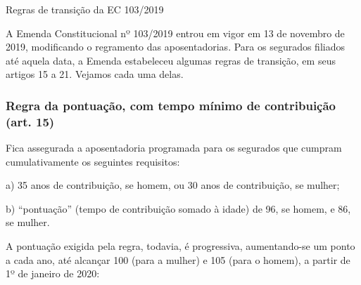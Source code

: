 \documentclass[
  letterpaper,
  DIV=11,
  numbers=noendperiod]{scrartcl}
\begin{document}
Regras de transição da EC 103/2019

A Emenda Constitucional nº 103/2019 entrou em vigor em 13 de novembro de
2019, modificando o regramento das aposentadorias. Para os segurados
filiados até aquela data, a Emenda estabeleceu algumas regras de
transição, em seus artigos 15 a 21. Vejamos cada uma delas.

\hypertarget{regra-da-pontuauxe7uxe3o-com-tempo-muxednimo-de-contribuiuxe7uxe3o-art.-15}{%
\subsubsection{Regra da pontuação, com tempo mínimo de contribuição
(art.
15)}\label{regra-da-pontuauxe7uxe3o-com-tempo-muxednimo-de-contribuiuxe7uxe3o-art.-15}}

Fica assegurada a aposentadoria programada para os segurados que cumpram
cumulativamente os seguintes requisitos:

a) 35 anos de contribuição, se homem, ou 30 anos de contribuição, se
mulher;

b) ``pontuação'' (tempo de contribuição somado à idade) de 96, se homem,
e 86, se mulher.

A pontuação exigida pela regra, todavia, é progressiva, aumentando-se um
ponto a cada ano, até alcançar 100 (para a mulher) e 105 (para o homem),
a partir de 1º de janeiro de 2020:
\end{document}
